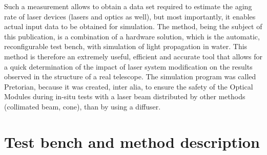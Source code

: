 \documentclass[a4paper,11pt]{article}
\begin{document}
%
Such a measurement allows to obtain a data set required to estimate the aging rate of laser devices (lasers and optics as
well), but most importantly, it enables actual input data to be obtained for simulation. The method,
being the subject of this publication, is a combination of a hardware solution, which is the automatic,
reconfigurable test bench, with simulation of light propagation in water. This method is therefore
an extremely useful, efficient and accurate tool that allows for a quick determination of the impact
of laser system modification on the results observed in the structure of a real telescope. The
simulation program was called Pretorian, because it was created, inter alia, to ensure the safety of
the Optical Modules during in-situ tests with a laser beam distributed by other methods (collimated
beam, cone), than by using a diffuser.
%
\section{Test bench and method description}
\end{document}
